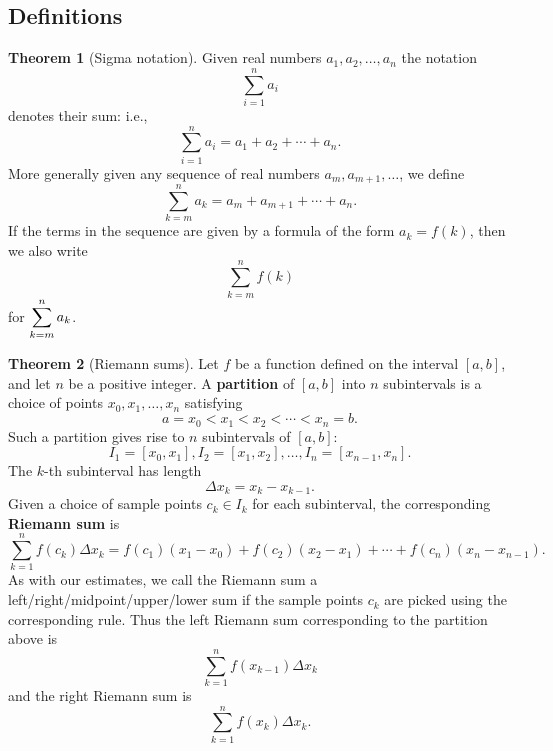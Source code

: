 \documentclass[11pt]{article}
\theoremstyle{definition}
\theoremstyle{named}
\newtheorem*{namedtheorem}{Theorem}
\numberwithin{myalgctr}{section}
\begin{document}
\thispagestyle{fancy}
\subsection*{Definitions}
\begin{namedtheorem}[Sigma notation] Given real numbers $a_1, a_2, \dots, a_n$ the notation
  \[
  \sum_{i=1}^{n}a_i
  \]
denotes their sum: i.e.,
\[
\sum_{i=1}^{n}a_i=a_1+a_2+\cdots +a_n.
\]
More generally given any sequence of real numbers $a_{m}, a_{m+1},\dots$, we define
\[
\sum_{k=m}^na_k=a_m+a_{m+1}+\cdots +a_{n}.
\]
If the terms in the sequence are given by a formula of the form $a_k=f(k)$, then we also write
\[
\sum_{k=m}^nf(k)
\]
for $\displaystyle\sum_{k=m}^na_k$.

\end{namedtheorem}
\begin{namedtheorem}[Riemann sums] Let $f$ be a function defined on the interval $[a,b]$, and let $n$ be a positive integer. A {\bf partition} of $[a,b]$ into $n$ subintervals is a choice of points $x_0, x_1,\dots, x_n$ satisfying
  \[
  a=x_0<x_1<x_2<\cdots <x_n=b.
  \]
Such a partition gives rise to $n$ subintervals of $[a,b]$:
\[
I_1=[x_0, x_1], I_2=[x_1, x_2], \dots , I_n=[x_{n-1}, x_n].
\]
The $k$-th subinterval has length
\[
\Delta x_k=x_{k}-x_{k-1}.
\]
Given a choice of sample points $c_k\in I_k$ for each subinterval, the corresponding {\bf Riemann sum} is
\[
\sum_{k=1}^n f(c_k)\Delta x_k=f(c_1)(x_1-x_0)+f(c_2)(x_2-x_1)+\cdots +f(c_n)(x_n-x_{n-1}).
\]
As with our estimates, we call the Riemann sum a left/right/midpoint/upper/lower sum if the sample points $c_k$ are picked using the corresponding rule. Thus the left Riemann sum corresponding to the partition above is
\[
\sum_{k=1}^nf(x_{k-1})\Delta x_k
\]
and the right Riemann sum is
\[
\sum_{k=1}^nf(x_k)\Delta x_{k}.
\]


\end{namedtheorem}


\end{document}
